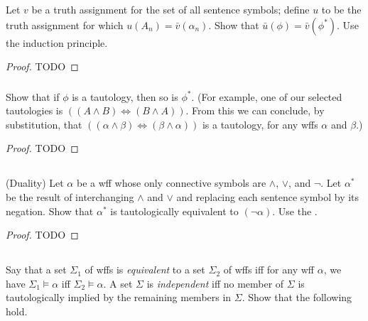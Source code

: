 \documentclass{report}
\begin{document}
  Let $v$ be a truth assignment for the set of all sentence symbols; define $u$
    to be the truth assignment for which $u(A_n) = \bar{v}(\alpha_n)$.
  Show that $\bar{u}(\phi) = \bar{v}(\phi^*)$.
  Use the induction principle.

  \begin{proof}
    TODO
  \end{proof}

\subsubsection{}%

  Show that if $\phi$ is a tautology, then so is $\phi^*$.
  (For example, one of our selected tautologies is
    $((A \land B) \Leftrightarrow (B \land A))$. From this we can conclude, by
    substitution, that
    $((\alpha \land \beta) \Leftrightarrow (\beta \land \alpha))$ is a
    tautology, for any wffs $\alpha$ and $\beta$.)

  \begin{proof}
    TODO
  \end{proof}

\subsection{}%

  (Duality) Let $\alpha$ be a wff whose only connective symbols are $\land$,
    $\lor$, and $\neg$.
  Let $\alpha^*$ be the result of interchanging $\land$ and $\lor$ and replacing
    each sentence symbol by its negation.
  Show that $\alpha^*$ is tautologically equivalent to $(\neg \alpha)$.
  Use the .

  \begin{proof}
    TODO
  \end{proof}

\subsection{}%

  Say that a set $\Sigma_1$ of wffs is \textit{equivalent} to a set $\Sigma_2$
    of wffs iff for any wff $\alpha$, we have $\Sigma_1 \vDash \alpha$ iff
    $\Sigma_2 \vDash \alpha$.
  A set $\Sigma$ is \textit{independent} iff no member of $\Sigma$ is
    tautologically implied by the remaining members in $\Sigma$.
  Show that the following hold.
\end{document}
